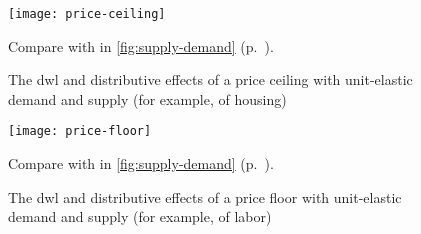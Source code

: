 \begin{figure}[htbp]
	\begin{center}
	\texttt{[image: price-ceiling]}
	\caption[Efficiency and Equity of a Price Ceiling]{The \gls{dwl} and distributive effects of a price ceiling with unit-elastic demand and supply (for example, of housing)}
	\end{center}
	\scriptsize{Compare with  in \autoref{fig:supply-demand} (p.~\pageref{fig:supply-demand}).}
	\label{fig:price-ceiling}
\end{figure}

\begin{figure}[htbp]
	\begin{center}
	\texttt{[image: price-floor]}
	\caption[Efficiency and Equity of a Price Floor]{The \gls{dwl} and distributive effects of a price floor with unit-elastic demand and supply (for example, of labor)}
	\end{center}
	\scriptsize{Compare with  in \autoref{fig:supply-demand} (p.~\pageref{fig:supply-demand}).}
	\label{fig:price-floor}
\end{figure}

